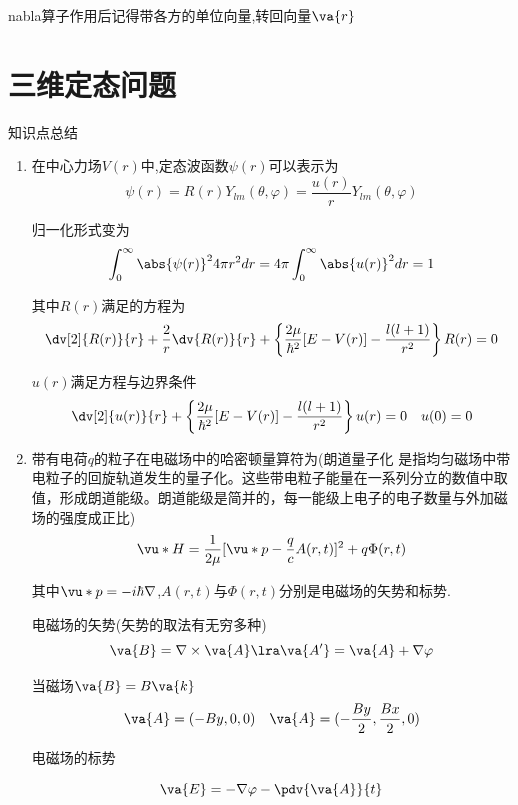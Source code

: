             nabla算子作用后记得带各方的单位向量,转回向量$\va{r}$


    \section{三维定态问题}
            \begin{formal}
                知识点总结
                
                \begin{enumerate}
                    \item 在中心力场$V(r)$中,定态波函数$\psi(r)$可以表示为
                    $$ \psi(r) = R(r) Y_{lm}(\theta,\varphi) = \frac{u(r)}{r}Y_{lm}(\theta,\varphi) $$

                    归一化形式变为
                    $$ \int_{0}^{\infty} \abs{\psi(r)}^{2} 4\pi r^{2} dr = 4 \pi \int_{0}^{\infty}\abs{u(r)}^{2} dr = 1 $$
                    
                    其中$R(r)$满足的方程为
                    $$ \dv[2]{R(r)}{r} + \frac{2}{r} \dv{R(r)}{r} + \left\{ \frac{2\mu}{\hbar^{2}}[E-V(r)] - \frac{l(l+1)}{r^{2}} \right\}   R(r)  = 0 $$

                    $u(r)$满足方程与边界条件
                    $$ \dv[2]{u(r)}{r} + \left\{   \frac{2\mu}{\hbar^{2}}[E-V(r)] - \frac{l(l+1)}{r^{2}} \right\} u(r) = 0 \quad u(0) = 0 $$

                    \item 带有电荷$q$的粒子在电磁场中的哈密顿量算符为(朗道量子化
                    是指均匀磁场中带电粒子的回旋轨道发生的量子化。这些带电粒子能量在一系列分立的数值中取值，形成朗道能级。朗道能级是简并的，每一能级上电子的电子数量与外加磁场的强度成正比)
                    $$ \vu*{H} = \frac{1}{2\mu} [\vu*{p} - \frac{q}{c} A(r,t) ]^{2} + q \Phi(r,t) $$

                    其中$\vu*{p} = -i\hbar \nabla$,$A(r,t)$与$\Phi(r,t)$分别是电磁场的矢势和标势.

                    电磁场的矢势(矢势的取法有无穷多种)
                    $$ \va{B} = \nabla \times \va{A}  \lra  \va{A'} = \va{A} + \nabla \varphi $$

                    当磁场$ \va{B} = B \va{k} $
                    $$ \va{A} = (-By,0,0) \quad \va{A} = (-\frac{By}{2},\frac{Bx}{2},0) $$
                    
                    电磁场的标势

                    $$ \va{E} = -\nabla \varphi - \pdv{\va{A}}{t} $$
                    

\end{enumerate}
\end{formal}
